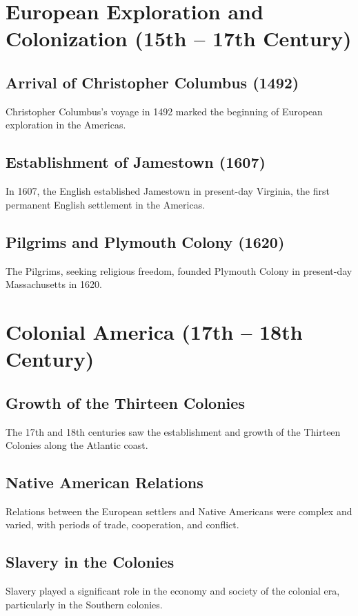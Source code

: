 \documentclass[a4paper,12pt]{book}
\begin{document}
\section{European Exploration and Colonization (15th – 17th Century)}
\label{sec:european-exploration-colonization}
\subsection{Arrival of Christopher Columbus (1492)}
\label{subsec:arrival-christopher-columbus}
Christopher Columbus's voyage in 1492 marked the beginning of European exploration in the Americas.

\subsection{Establishment of Jamestown (1607)}
\label{subsec:establishment-jamestown}
In 1607, the English established Jamestown in present-day Virginia, the first permanent English settlement in the Americas.

\subsection{Pilgrims and Plymouth Colony (1620)}
\label{subsec:pilgrims-plymouth-colony}
The Pilgrims, seeking religious freedom, founded Plymouth Colony in present-day Massachusetts in 1620.

\section{Colonial America (17th – 18th Century)}
\label{sec:colonial-america}
\subsection{Growth of the Thirteen Colonies}
\label{subsec:growth-thirteen-colonies}
The 17th and 18th centuries saw the establishment and growth of the Thirteen Colonies along the Atlantic coast.

\subsection{Native American Relations}
\label{subsec:native-american-relations}
Relations between the European settlers and Native Americans were complex and varied, with periods of trade, cooperation, and conflict.

\subsection{Slavery in the Colonies}
\label{subsec:slavery-colonies}
Slavery played a significant role in the economy and society of the colonial era, particularly in the Southern colonies.
\end{document}
